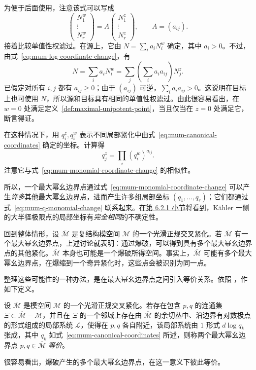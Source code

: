 为便于后面使用，注意该式可以写成
\begin{equation}\label{eq:mum-log-matrix-change}
\begin{pmatrix}N_1^w\\\vdots\\N_r^w\end{pmatrix}
=A\begin{pmatrix}N_1^z\\\vdots\\N_r^z\end{pmatrix},\qquad A=(a_{ij}).
\end{equation}
接着比较单值性权滤过。在源上，它由 $N=\sum_i a_iN_i^w$ 确定，其中 $a_i>0$。不过，由式~\eqref{eq:mum-log-coordinate-change}，有
\[
N=\sum_i a_iN_i^w=\sum_j\left(\sum_i a_i a_{ij}\right)N_j^z.
\]
已假定对所有 $i,j$ 都有 $a_{ij}\geq0$；由于 $(a_{ij})$ 可逆，$\sum_i a_i a_{ij}>0$。这说明在目标上也可使用 $N$，所以源和目标具有相同的单值性权滤过。由此很容易看出，在 $w=0$ 处满足定义~\ref{def:maximal-unipotent-point}，当且仅当在 $z=0$ 处满足它，断言得证。

在这种情况下，用 $q_i^z,q_i^w$ 表示不同局部紧化中由式~\eqref{eq:mum-canonical-coordinates} 确定的坐标。计算得
\begin{equation}\label{eq:mum-q-monomial-change}
q_j^z=\prod_i(q_i^w)^{a_{ij}}.
\end{equation}
注意它与式~\eqref{eq:mum-monomial-coordinate-change} 的相似性。

所以，一个最大幂幺边界点通过式~\eqref{eq:mum-monomial-coordinate-change} 可以产生\emph{许多}其他最大幂幺边界点，进而产生许多组局部坐标 $(q_1,\ldots,q_r)$；它们都通过式~\eqref{eq:mum-q-monomial-change} 联系起来。在\hyperref[subsec:large-radius-limits]{第 6.2.1 小节}将看到，Kähler 一侧的大半径极限点的局部坐标有\emph{完全相同}的不确定性。

回到整体情形，设 $\overline{\mathcal M}$ 是复结构模空间 $\mathcal M$ 的一个光滑正规交叉紧化。若 $\overline{\mathcal M}$ 有一个最大幂幺边界点，上述讨论就表明：通过爆破，可以得到具有多个最大幂幺边界点的其他紧化。$\overline{\mathcal M}$ 本身也可能是一个爆破所得空间。事实上，$\overline{\mathcal M}$ 可能有多个最大幂幺边界点，在爆缩到一个奇异紧化时，这些点会被识别为同一点。

整理这些可能性的一种办法，是在最大幂幺边界点之间引入等价关系。依照 ，作如下定义。
\begin{definition}\label{def:equivalent-mum-points}
设 $\overline{\mathcal M}$ 是模空间 $\mathcal M$ 的一个光滑正规交叉紧化。若存在包含 $p,q$ 的连通集 $\Xi\subset\overline{\mathcal M}-\mathcal M$，并且在 $\Xi$ 的一个邻域上存在由 $\overline{\mathcal M}$ 的余切丛中、沿边界有对数极点的形式组成的局部系统 $\mathcal L$，使得在 $p,q$ 各自附近，该局部系统由 $1$ 形式 $d\log q_k$ 张成，其中 $q_k$ 如式~\eqref{eq:mum-canonical-coordinates} 所述，则称两个最大幂幺边界点 $p,q\in\overline{\mathcal M}$ \emph{等价}。
\end{definition}
很容易看出，爆破产生的多个最大幂幺边界点，在这一意义下彼此等价。


